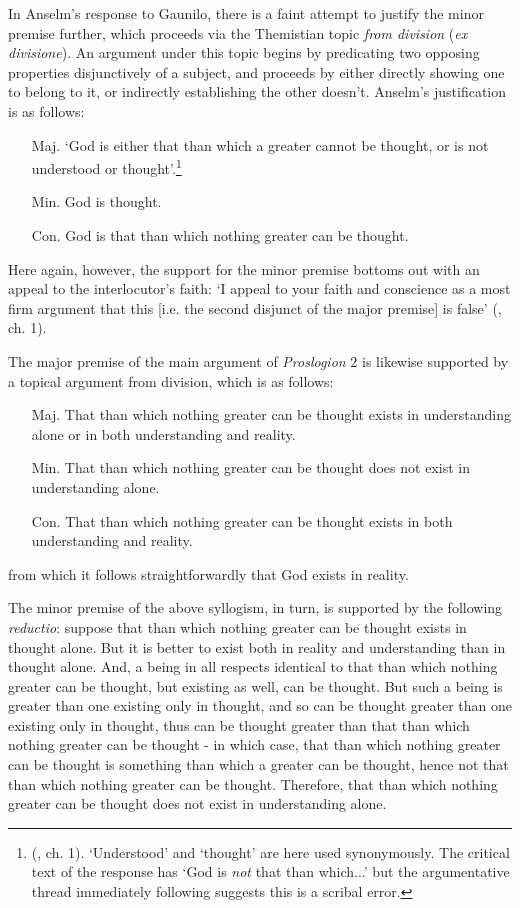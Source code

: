 \documentclass[]{birkjour}
\begin{document}
In Anselm's response to Gaunilo, there is a faint attempt to justify the minor premise further, which proceeds via the Themistian topic \textit{from division} (\textit{ex divisione}). An argument under this topic begins by predicating two opposing properties disjunctively of a subject, and proceeds by either directly showing one to belong to it, or indirectly establishing the other doesn't. Anselm's justification is as follows:

\begin{enumerate}
\item[Maj.] `God is either that than which a greater cannot be thought, or is not understood or thought'.\footnote{(\cite{AnselmResp}, ch. 1). `Understood' and `thought' are here used synonymously. The critical text of the response has `God is \textit{not} that than which...' but the argumentative thread immediately following suggests this is a scribal error.}
\item[Min.] God is thought.
\item[Con.] God is that than which nothing greater can be thought.
\end{enumerate}
Here again, however, the support for the minor premise bottoms out with an appeal to the interlocutor's faith: `I appeal to your faith and conscience as a most firm argument that this [i.e. the second disjunct of the major premise] is false' (\cite{AnselmResp}, ch. 1).

The major premise of the main argument of \textit{Proslogion} 2 is likewise supported by a topical argument from division, which is as follows:

\begin{itemize}
\item[Maj.] That than which nothing greater can be thought exists in understanding alone or in both understanding and reality.
\item[Min.] That than which nothing greater can be thought does not exist in understanding alone.
\item[Con.] That than which nothing greater can be thought exists in both understanding and reality.
\end{itemize}
from which it follows straightforwardly that God exists in reality. 

The minor premise of the above syllogism, in turn, is supported by the following \textit{reductio}: suppose that than which nothing greater can be thought exists in thought alone. But it is better to exist both in reality and understanding than in thought alone. And, a being in all respects identical to that than which nothing greater can be thought, but existing as well, can be thought. But such a being is greater than one existing only in thought, and so can be thought greater than one existing only in thought, thus can be thought greater than that than which nothing greater can be thought - in which case, that than which nothing greater can be thought is something than which a greater can be thought, hence not that than which nothing greater can be thought. Therefore, that than which nothing greater can be thought does not exist in understanding alone.
\end{document}
